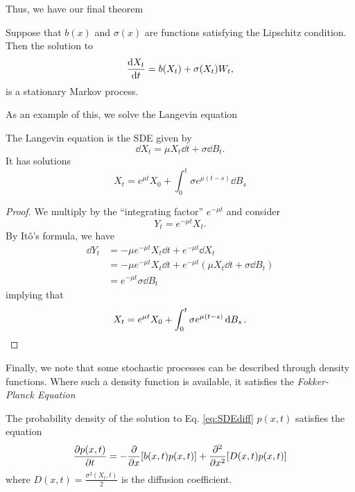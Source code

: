 \documentclass[prb,12pt]{revtex4-2}
\theoremstyle{definition}
\theoremstyle{definition}
\theoremstyle{definition}
\begin{document}
Thus, we have our final theorem
\begin{Theorem}
	Suppose that $b(x)$ and $\sigma(x)$ are functions satisfying the Lipschitz condition. Then the solution to
		\begin{equation}\label{eq:SDEdiff2}
		\dv{X_t}{t}=b(X_t)+\sigma(X_t)W_t,
	\end{equation}
	is a stationary Markov process.
\end{Theorem}
As an example of this, we solve the Langevin equation
\begin{Example}
	The Langevin equation is the SDE given by
	\[\dd{X_t} = \mu X_t \dd{t} + \sigma \dd{B_t}.\]
	It has solutions
	\[X_t = e^{\mu t}X_0 + \int_0^t \sigma e^{\mu(t-s)}\dd{B_s}\]
\end{Example}
\begin{proof}
	We multiply by the ``integrating factor'' $e^{-\mu t}$ and consider
	\[Y_t = e^{-\mu t}X_t.\]
	By Itô's formula, we have
	\begin{align*}
	\dd{Y_t} &= -\mu e^{-\mu t}X_t \dd{t} + e^{-\mu t}\dd{X_t}\\
	&=  -\mu e^{-\mu t}X_t \dd{t} + e^{-\mu t}(\mu X_t \dd{t} + \sigma \dd{B_t})\\
	&= e^{-\mu t}\sigma \dd{B_t}
\end{align*}
implying that
\[X_t = e^{\mu t}X_0 + \int_0^t \sigma e^{\mu(t-s)}\dd{B_s}.\qedhere\]
\end{proof}
Finally, we note that some stochastic processes can be described through density functions. Where such a density function is available, it satisfies the \emph{Fokker-Planck Equation}
\begin{Theorem}
	The probability density of the solution to Eq. \eqref{eq:SDEdiff} $p(x,t)$ satisfies the equation
	\[\pdv{p(x,t)}{t}=-\pdv{x}[b(x,t)p(x,t)]+\pdv[2]{x}[D(x,t)p(x,t)]\]
	where $D(x,t) =\frac{\sigma^2(X_t, t)}{2}$ is the diffusion coefficient.
\end{Theorem}


\nocite{kuo2005introduction}
\nocite{oksendal2010stochastic}
\end{document}
